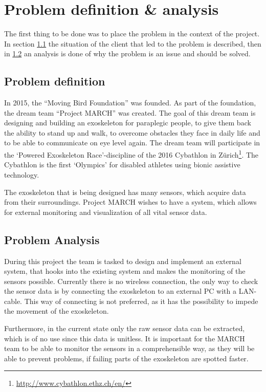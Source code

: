 \section{Problem definition \& analysis} \label{sec:probdef}
The first thing to be done was to place the problem in the context of the project. In section \ref{sec:prodef} the situation of the client that led to the problem is described, then in \ref{sec:proana} an analysis is done of why the problem is an issue and should be solved.

\subsection{Problem definition}\label{sec:prodef}
In 2015, the ``Moving Bird Foundation'' was founded. As part of the foundation, the dream team ``Project MARCH'' was created. The goal of this dream team is designing and building an exoskeleton for paraplegic people, to give them back the ability to stand up and walk, to overcome obstacles they face in daily life and to be able to communicate on eye level again. The dream team will participate in the `Powered Exoskeleton Race'-discipline of the 2016 Cybathlon in Zürich\footnote{\url{http://www.cybathlon.ethz.ch/en/}}. The Cybathlon is the first `Olympics' for disabled athletes using bionic assistive technology.
 
The exoskeleton that is being designed has many sensors, which acquire data from their surroundings. Project MARCH wishes to have a system, which allows for external monitoring and visualization of all vital sensor data.

\subsection{Problem Analysis}\label{sec:proana}
During this project the team is tasked to design and implement an external system, that hooks into the existing system and makes the monitoring of the sensors possible. Currently there is no wireless connection, the only way to check the sensor data is by connecting the exoskeleton to an external PC with a LAN-cable. This way of connecting is not preferred, as it has the possibility to impede the movement of the exoskeleton.

Furthermore, in the current state only the raw sensor data can be extracted, which is of no use since this data is unitless. It is important for the MARCH team to be able to monitor the sensors in a comprehensible way, as they will be able to prevent problems, if failing parts of the exoskeleton are spotted faster.
